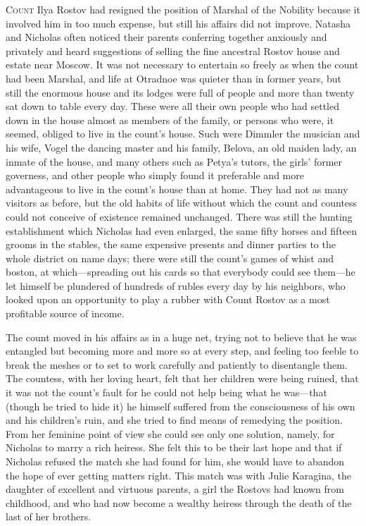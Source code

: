 \lettrine[lines=2, loversize=0.3, lraise=0]{\initfamily C}{ount}
Ilya Rostov had resigned the position of Marshal of the
Nobility because it involved him in too much expense, but still
his affairs did not improve. Natasha and Nicholas often noticed
their parents conferring together anxiously and privately and
heard suggestions of selling the fine ancestral Rostov house and
estate near Moscow. It was not necessary to entertain so freely
as when the count had been Marshal, and life at Otradnoe was
quieter than in former years, but still the enormous house and
its lodges were full of people and more than twenty sat down to
table every day. These were all their own people who had settled
down in the house almost as members of the family, or persons who
were, it seemed, obliged to live in the count's house. Such were
Dimmler the musician and his wife, Vogel the dancing master and
his family, Belova, an old maiden lady, an inmate of the house,
and many others such as Petya's tutors, the girls' former
governess, and other people who simply found it preferable and
more advantageous to live in the count's house than at home. They
had not as many visitors as before, but the old habits of life
without which the count and countess could not conceive of
existence remained unchanged. There was still the hunting
establishment which Nicholas had even enlarged, the same fifty
horses and fifteen grooms in the stables, the same expensive
presents and dinner parties to the whole district on name days;
there were still the count's games of whist and boston, at
which---spreading out his cards so that everybody could see
them---he let himself be plundered of hundreds of rubles every
day by his neighbors, who looked upon an opportunity to play a
rubber with Count Rostov as a most profitable source of income.

The count moved in his affairs as in a huge net, trying not to
believe that he was entangled but becoming more and more so at
every step, and feeling too feeble to break the meshes or to set
to work carefully and patiently to disentangle them. The
countess, with her loving heart, felt that her children were
being ruined, that it was not the count's fault for he could not
help being what he was---that (though he tried to hide it) he
himself suffered from the consciousness of his own and his
children's ruin, and she tried to find means of remedying the
position.  From her feminine point of view she could see only one
solution, namely, for Nicholas to marry a rich heiress. She felt
this to be their last hope and that if Nicholas refused the match
she had found for him, she would have to abandon the hope of ever
getting matters right. This match was with Julie Karagina, the
daughter of excellent and virtuous parents, a girl the Rostovs
had known from childhood, and who had now become a wealthy
heiress through the death of the last of her brothers.

